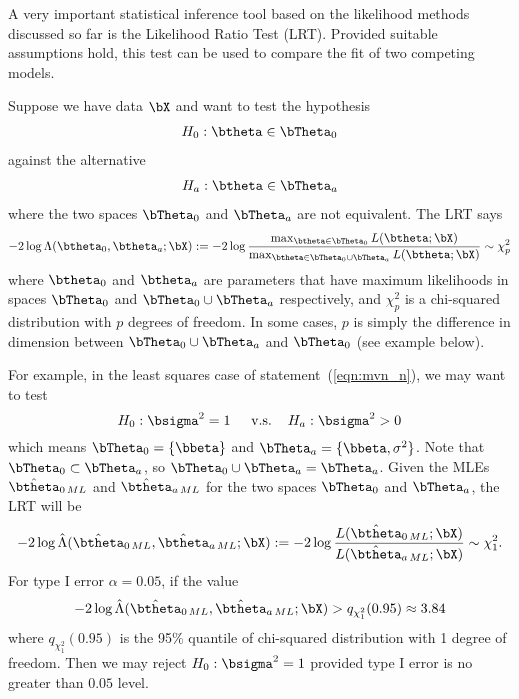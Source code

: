 A very important statistical inference tool based on the likelihood 
methods discussed so far is the Likelihood Ratio Test
(LRT). 
Provided suitable assumptions hold, this test can be used to compare the fit 
of two competing models. 

Suppose we have data $\bX$ and want to test the hypothesis
\begin{align*}
  H_0: \btheta \in \bTheta_0
\end{align*}
against the alternative
\begin{align*}
  H_a: \btheta \in \bTheta_a
\end{align*}
where the two spaces $\bTheta_0$ and $\bTheta_a$ are not equivalent.
The LRT says
\begin{equation}
-2\log \Lambda(\btheta_0, \btheta_a; \bX) :=
-2\log
\frac{
\max_{\btheta\in\bTheta_0} L(\btheta; \bX)
}{
\max_{\btheta\in\bTheta_0\cup\bTheta_a} L(\btheta; \bX)
}
\sim \chi^2_p
\label{eqn:LRT}
\end{equation}
where $\btheta_0$ and $\btheta_a$ are parameters that have maximum
likelihoods in spaces $\bTheta_0$ and $\bTheta_0\cup\bTheta_a$ respectively, and
$\chi^2_p$ is a chi-squared distribution
with $p$ degrees of freedom. In some cases, $p$ is simply
the difference in dimension between $\bTheta_0\cup\bTheta_a$ and
$\bTheta_0$ (see example below).

For example,
in the least squares case of statement~(\ref{eqn:mvn_n}),
we may want to test
$$
  H_0: \bsigma^2 = 1 \mbox{\hspace{.4cm} v.s.\hspace{.4cm}}
  H_a: \bsigma^2 > 0 
$$
which means $\bTheta_0 = \{\bbeta\}$ and $\bTheta_a = \{\bbeta, \sigma^2\}$.
Note that $\bTheta_0 \subset \bTheta_a$, so
$\bTheta_0 \cup \bTheta_a = \bTheta_a$.
Given the MLEs $\hat{\btheta}_{0\,ML}$ and $\hat{\btheta}_{a\,ML}$
for the two spaces $\bTheta_0$ and $\bTheta_a$, the LRT will be
$$
  -2\log \hat{\Lambda}(\hat{\btheta}_{0\,ML}, \hat{\btheta}_{a\,ML}; \bX) :=
  -2\log
  \frac{
    L(\hat{\btheta}_{0\,ML}; \bX)
  }{
    L(\hat{\btheta}_{a\,ML}; \bX)
  }
  \sim \chi^2_1.
$$
For type I error $\alpha = 0.05$, if
the value
$$
  -2\log \hat{\Lambda}(\hat{\btheta}_{0\,ML}, \hat{\btheta}_{a\,ML}; \bX)
  > q_{\chi^2_1}(0.95) \approx 3.84
$$
where $q_{\chi^2_1}(0.95)$ is the 95\% quantile of chi-squared distribution
with 1 degree of freedom.  Then we may reject $H_0: \bsigma^2 = 1$ provided 
type I error is no greater than $0.05$ level.


